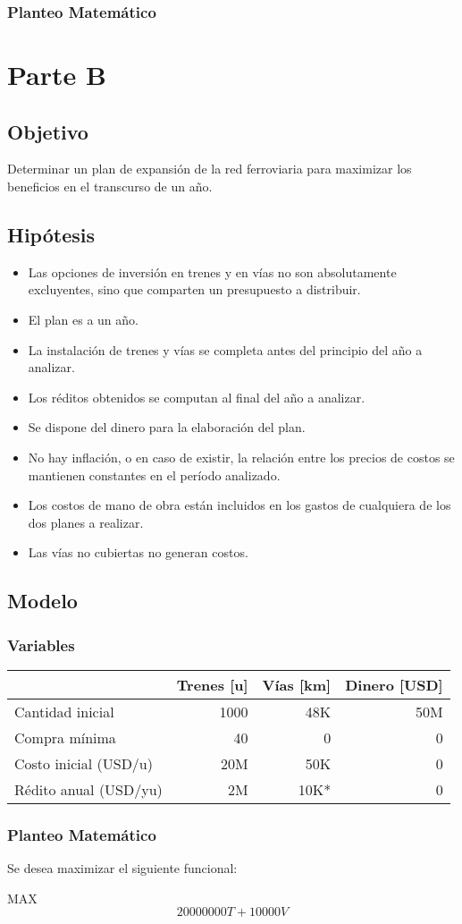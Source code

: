\documentclass[10pt, a4paper, titlepage,
	oneside,
	fleqn, leqno]{article}
\let\oldsection\section
\def\section{\cleardoublepage\oldsection}
\begin{document}
\subsubsection{Planteo Matemático}


\section{Parte B}
\subsection{Objetivo}
Determinar un plan de expansión de la red ferroviaria para maximizar los beneficios en el transcurso de un año.

\subsection{Hipótesis}
\begin{itemize}
 \item Las opciones de inversión en trenes y en vías no son absolutamente excluyentes, sino que comparten un presupuesto a distribuir.
 \item El plan es a un año.
 \item La instalación de trenes y vías se completa antes del principio del año a analizar.
 \item Los réditos obtenidos se computan al final del año a analizar.
 \item Se dispone del dinero para la elaboración del plan.
 \item No hay inflación, o en caso de existir, la relación entre los precios de costos se mantienen constantes en el período analizado.
 \item Los costos de mano de obra están incluidos en los gastos de cualquiera de los dos planes a realizar.
 \item Las vías no cubiertas no generan costos.
\end{itemize}

\subsection{Modelo}
\subsubsection{Variables}

\begin{tabular}{|l|r|r|r|} \hline
    & Trenes [u] & Vías [km] & Dinero [USD]\\ \hline
  Cantidad inicial & 1000 & 48K & 50M\\ \hline
  Compra mínima & 40 & 0 & 0\\ \hline
  Costo inicial (USD/u) & 20M & 50K & 0\\ \hline
  Rédito anual (USD/yu) & 2M & 10K* & 0\\ \hline
\end{tabular}

\subsubsection{Planteo Matemático}
Se desea maximizar el siguiente funcional:

MAX     $$     20000000 T + 10000 V$$


\end{document}
